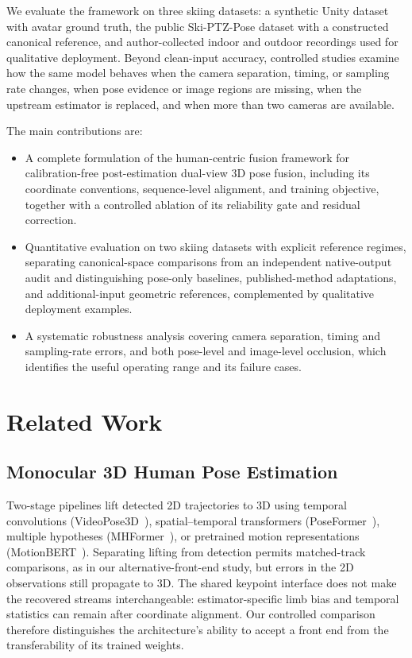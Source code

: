 \documentclass[preprint,12pt]{elsarticle}
\begin{document}
We evaluate the framework on three skiing datasets: a synthetic Unity dataset with avatar ground truth, the public Ski-PTZ-Pose dataset with a constructed canonical reference, and author-collected indoor and outdoor recordings used for qualitative deployment. Beyond clean-input accuracy, controlled studies examine how the same model behaves when the camera separation, timing, or sampling rate changes, when pose evidence or image regions are missing, when the upstream estimator is replaced, and when more than two cameras are available.

The main contributions are:
\begin{itemize}
    \item A complete formulation of the human-centric fusion framework for calibration-free post-estimation dual-view 3D pose fusion, including its coordinate conventions, sequence-level alignment, and training objective, together with a controlled ablation of its reliability gate and residual correction.
    \item Quantitative evaluation on two skiing datasets with explicit reference regimes, separating canonical-space comparisons from an independent native-output audit and distinguishing pose-only baselines, published-method adaptations, and additional-input geometric references, complemented by qualitative deployment examples.
    \item A systematic robustness analysis covering camera separation, timing and sampling-rate errors, and both pose-level and image-level occlusion, which identifies the useful operating range and its failure cases.
\end{itemize}

\section{Related Work}
\label{sec:related_work}

\subsection{Monocular 3D Human Pose Estimation}
Two-stage pipelines lift detected 2D trajectories to 3D using temporal convolutions (VideoPose3D~\cite{pavllo2019videopose3d}), spatial--temporal transformers (PoseFormer~\cite{zheng2021poseformer}), multiple hypotheses (MHFormer~\cite{li2022mhformer}), or pretrained motion representations (MotionBERT~\cite{zhu2023motionbert}). Separating lifting from detection permits matched-track comparisons, as in our alternative-front-end study, but errors in the 2D observations still propagate to 3D. The shared keypoint interface does not make the recovered streams interchangeable: estimator-specific limb bias and temporal statistics can remain after coordinate alignment. Our controlled comparison therefore distinguishes the architecture's ability to accept a front end from the transferability of its trained weights.
\end{document}
